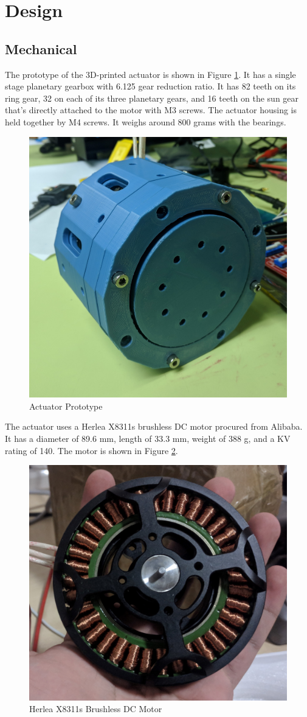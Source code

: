\documentclass[english]{upeeei}
\begin{document}
\section{Design}

\subsection{Mechanical}

The prototype of the 3D-printed actuator is shown in Figure \ref{fig:actuator-prototype}. It has a single stage planetary gearbox with 6.125 gear reduction ratio. It has 82 teeth on its ring gear, 32 on each of its three planetary gears, and 16 teeth on the sun gear that's directly attached to the motor with M3 screws. The actuator housing is held together by M4 screws. It weighs around 800 grams with the bearings.

\begin{figure}[H]
\begin{centering}
\includegraphics[width=0.5\columnwidth]{images/actuator_prototype}
\par\end{centering}
\caption{Actuator Prototype\label{fig:actuator-prototype}}
\end{figure}

The actuator uses a Herlea X8311s brushless DC motor procured from Alibaba. It has a diameter of 89.6 mm, length of 33.3 mm, weight of 388 g, and a KV rating of 140. The motor is shown in Figure \ref{fig:motor}.

\begin{figure}[H]
\begin{centering}
\includegraphics[width=0.5\columnwidth]{images/motor}
\par\end{centering}
\caption{Herlea X8311s Brushless DC Motor\label{fig:motor}}
\end{figure}
\end{document}
